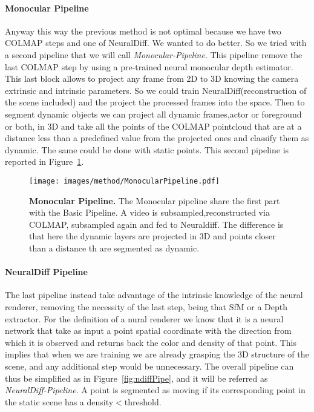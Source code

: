 \paragraph{Monocular Pipeline}
Anyway this way the previous method is not optimal because we have two COLMAP steps and one of NeuralDiff. We wanted 
to do better. So we tried with a second pipeline that we will call \textit{Monocular-Pipeline}.
This pipeline remove the last COLMAP step by using a pre-trained neural monocular depth estimator.
This last block allows to project any frame from 2D to 3D knowing the camera extrinsic and intrinsic
parameters. So we could train NeuralDiff(reconstruction of the scene included) and the 
project the processed frames into the space. Then to segment dynamic objects we can project
all dynamic frames,actor or foreground or both, in 3D and take all the points of the COLMAP pointcloud
that are at a distance less than a predefined value from the projected ones and classify them as dynamic.
The same could be done with static points. This second pipeline is reported in Figure~\ref{fig:monoPipe}.

\begin{figure}[t]
    \centering
    \texttt{[image: images/method/MonocularPipeline.pdf]} 
    \caption{\textbf{Monocular Pipeline.} The Monocular pipeline share the first part with the Basic Pipeline. A
    video is subsampled,reconstructed via COLMAP, subsampled again and fed to Neuraldiff. The difference is that here
    the dynamic layers are projected in 3D and points closer than a distance th are segmented as dynamic.}\label{fig:monoPipe}
\end{figure}

\paragraph{NeuralDiff Pipeline}
The last pipeline instead take advantage of the intrinsic knowledge of the neural renderer, removing the necessity of the 
last step, being that SfM or a Depth extractor. For the definition of a nural renderer we know that it is a neural 
network that take as input a point spatial coordinate with the direction from which it is observed and returns back the 
color and density of that point. This implies that when we are training we are already grasping the 3D structure of the scene,
and any additional step would be unnecessary. The overall pipeline can thus be simplified as in Figure~\ref{fig:ndiffPipe}, and it 
will be referred as \textit{NeuralDiff-Pipeline}. A point is segmented as moving if its corresponding point in the static
scene has a density$<$threshold.

